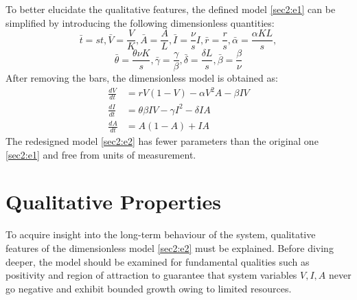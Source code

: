 \documentclass[12pt]{article}
\numberwithin{equation}{section}
\begin{document}
To better elucidate the qualitative features, the defined model \eqref{sec2:e1} can be simplified by introducing the following dimensionless quantities:\\
\begin{equation*}
\bar t=st, \bar V=\frac{V}{K}, \bar A=\frac{A}{L}, \bar I=\frac{\nu}{s}I, \bar r=\frac{r}{s}, \bar \alpha=\frac{\alpha KL}{s},
\end{equation*}
\begin{equation*}
 \bar \theta=\frac{\theta \nu K}{s}, \bar \gamma =\frac{\gamma}{\beta}, \bar \delta=\frac{\delta L}{s}, \bar \beta=\frac{\beta}{\nu}
\end{equation*}
After removing the bars, the dimensionless model is obtained as:
 \begin{subequations}\label{sec2:e2}
	\begin{align}
	\label{sec2:e2a} \frac{dV}{dt}&=rV(1-V)-\alpha V^2A - \beta IV\\
	\label{sec2:e2b} \frac{dI}{dt}&=\theta \beta IV - \gamma I^2 - \delta IA\\
	\label{sec2:e2c} \frac{dA}{dt}&=A(1-A)+IA
	\end{align}
\end{subequations}
The redesigned model \eqref{sec2:e2} has fewer parameters than the original one \eqref{sec2:e1} and free from units of measurement.
\section{Qualitative Properties}
To acquire insight into the long-term behaviour of the system, qualitative features of the dimensionless model \eqref{sec2:e2} must be explained. Before diving deeper, the model should be examined for fundamental qualities such as positivity and region of attraction to guarantee that system variables $V,I,A$ never go negative and exhibit bounded growth owing to limited resources.
\end{document}
